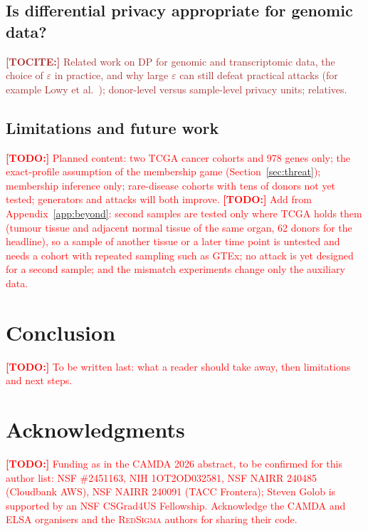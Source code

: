 \documentclass[webpdf,contemporary,large]{oup-authoring-template}
\newif\ifdraft \drafttrue
\newcommand{\annot}[3]{\ifdraft\textcolor{#1}{\textbf{[#2:]} #3}\fi}
\newcommand{\todo}[1]{\annot{red}{TODO}{#1}}
\newcommand{\tocite}[1]{\annot{Brown}{TOCITE}{#1}}
\newcommand{\redsigma}{\textsc{RedSigma}}
\begin{document}
\subsection{Is differential privacy appropriate for genomic data?}
\label{sec:gov-dp}

\tocite{Related work on DP for genomic and transcriptomic data, the choice of $\varepsilon$ in practice, and why large $\varepsilon$ can still defeat practical attacks (for example Lowy et al.\ \citep{lowy2024does}); donor-level versus sample-level privacy units; relatives.}

\subsection{Limitations and future work}
\label{sec:gov-future}

\todo{Planned content: two TCGA cancer cohorts and 978 genes only; the exact-profile assumption of the membership game (Section~\ref{sec:threat}); membership inference only; rare-disease cohorts with tens of donors not yet tested; generators and attacks will both improve.}
\todo{Add from Appendix~\ref{app:beyond}: second samples are tested only where TCGA holds them (tumour tissue and adjacent normal tissue of the same organ, 62 donors for the headline), so a sample of another tissue or a later time point is untested and needs a cohort with repeated sampling such as GTEx; no attack is yet designed for a second sample; and the mismatch experiments change only the auxiliary data.}

\section{Conclusion}
\label{sec:conclusion}

\todo{To be written last: what a reader should take away, then limitations and next steps.}

\section*{Acknowledgments}
\todo{Funding as in the CAMDA 2026 abstract, to be confirmed for this author list: NSF \#2451163, NIH 1OT2OD032581, NSF NAIRR 240485 (Cloudbank AWS), NSF NAIRR 240091 (TACC Frontera); Steven Golob is supported by an NSF CSGrad4US Fellowship. Acknowledge the CAMDA and ELSA organisers and the \redsigma{} authors for sharing their code.}
\end{document}
